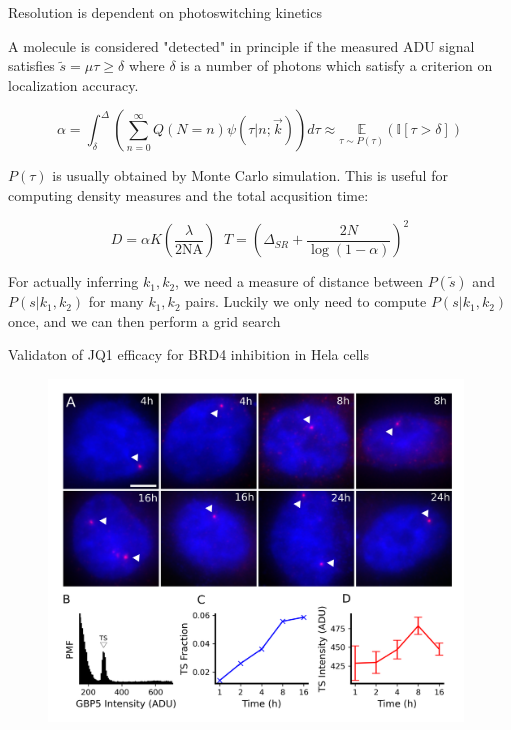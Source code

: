 \documentclass{beamer}					%
\begin{document}
\begin{frame}{Resolution is dependent on photoswitching kinetics}

A molecule is considered "detected" in principle if the measured ADU signal satisfies $\tilde{s} =\mu\tau \geq \delta$ where $\delta$ is a number of photons which satisfy a criterion on localization accuracy.

\begin{equation*}
\alpha = \int_{\delta}^{\Delta}\left(\sum_{n=0}^{\infty}Q(N=n)\psi(\tau|n;\vec{k})\right)d\tau \approx \underset{\tau\sim P(\tau)}{\mathbb{E}}\left(\mathbb{I}[\tau > \delta]\right)
\end{equation*}

$P(\tau)$ is usually obtained by Monte Carlo simulation. This is useful for computing density measures and the total acqusition time:

\begin{equation*}
D = \alpha K\left(\frac{\lambda}{2\mathrm{NA}}\right)\;\; T = \left(\Delta_{SR}+\frac{2N}{\log(1-\alpha)}\right)^{2}
\end{equation*}

For actually inferring $k_{1},k_{2}$, we need a measure of distance between $P(\tilde{s})$ and $P(s|k_{1},k_{2})$ for many $k_{1},k_{2}$ pairs. Luckily we only need to compute $P(s|k_{1},k_{2})$ once, and we can then perform a grid search

\end{frame}

\begin{frame}{Validaton of JQ1 efficacy for BRD4 inhibition in Hela cells}
\begin{figure}
\includegraphics[width=11cm]{Figure-2.png}
\end{figure}
\end{frame}
\end{document}
